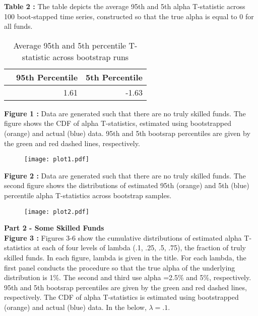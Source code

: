 \documentclass{article}
\begin{document}
\textbf{Table 2 : }The table depicts the average 95th and 5th alpha T-statistic across 100 boot-stapped time series, constructed so that the true alpha is equal to 0 for all funds.\begin{center}
\begin{table}[h]
\centering
\caption{Average 95th and 5th percentile T-statistic across bootstrap runs}
\begin{tabular}{lrr}
\toprule
{} &  95th Percentile &  5th Percentile \\
\midrule
{} &             1.61 &           -1.63 \\
\bottomrule
\end{tabular}
\end{table}
\end{center}
\newpage\textbf{Figure 1 : }Data are generated such that there are no truly skilled funds. The figure shows the CDF of alpha T-statistics, estimated using bootstrapped (orange) and actual (blue) data. 95th and 5th bootsrap percentiles are given by the green and red dashed lines, respectively.  
\begin{center}
 \begin{figure}[h!]
 \hspace{1cm}\texttt{[image: plot1.pdf]}\label{fig:plot1}
 \end{figure}
 \end{center}
\clearpage 
\textbf{Figure 2 : }Data are generated such that there are no truly skilled funds. The second figure shows the distributions of estimated 95th (orange) and 5th (blue) percentile alpha T-statistics across bootstrap samples.
\begin{center}
 \begin{figure}[h!]
 \hspace{1cm}\texttt{[image: plot2.pdf]}\label{fig:plot2}
 \end{figure}
 \end{center}
\clearpage 
\textbf{Part 2 - Some Skilled Funds} \\\textbf{Figure 3 : }Figures 3-6 show the cumulative distributions of estimated alpha T-statistics at each of four levels of lambda (.1, .25, .5, .75), the fraction of truly skilled funds.  In each figure, lambda is given in the title.  For each lambda, the first panel conducts the procedure so that the true alpha of the underlying distribution is 1\%.  The second and third use alpha =2.5\% and 5\%, respectively.  95th and 5th bootsrap percentiles are given by the green and red dashed lines, respectively. The CDF of alpha T-statistics is estimated using bootstrapped (orange) and actual (blue) data.  In the below, $\lambda=.1$.
\end{document}
